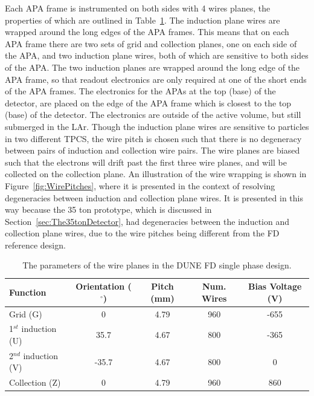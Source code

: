 Each APA frame is instrumented on both sides with 4 wires planes, the properties of which are outlined in Table~\ref{tab:DUNE_SP_WP}. The induction plane wires are wrapped around the long edges of the APA frames. This means that on each APA frame there are two sets of grid and collection planes, one on each side of the APA, and two induction plane wires, both of which are sensitive to both sides of the APA. The two induction planes are wrapped around the long edge of the APA frame, so that readout electronics are only required at one of the short ends of the APA frames. The electronics for the APAs at the top (base) of the detector, are placed on the edge of the APA frame which is closest to the top (base) of the detector. The electronics are outside of the active volume, but still submerged in the LAr. Though the induction plane wires are sensitive to particles in two different TPCS, the wire pitch is chosen such that there is no degeneracy between pairs of induction and collection wire pairs. The wire planes are biased such that the electrons will drift past the first three wire planes, and will be collected on the collection plane. An illustration of the wire wrapping is shown in Figure~\ref{fig:WirePitches}, where it is presented in the context of resolving degeneracies between induction and collection plane wires. It is presented in this way because the 35 ton prototype, which is discussed in Section~\ref{sec:The35tonDetector}, had degeneracies between the induction and collection plane wires, due to the wire pitches being different from the FD reference design. \\

\begin{table}
  \caption[The parameters of the wire planes in the DUNE FD single phase design]
          {The parameters of the wire planes in the DUNE FD single phase design.}
  \label{tab:DUNE_SP_WP}
  \centering
  \begin{tabular}{l c c c c}
    \toprule
    {Function}             & {Orientation ($^{\circ}$)} & {Pitch (mm)} & Num. Wires & Bias Voltage (V) \\ 
    \midrule
    Grid (G)               & 0                          & 4.79         & 960        & -655 \\
    
    1$^{st}$ induction (U) & 35.7                       & 4.67         & 800        & -365 \\
    
    2$^{nd}$ induction (V) & -35.7                      & 4.67         & 800        & 0    \\
    
    Collection (Z)         & 0                          & 4.79         & 960        & 860 \\
    \bottomrule
  \end{tabular}
\end{table}

